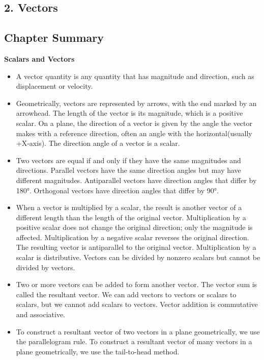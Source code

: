 \documentclass[12pt,addpoints]{exam}
\begin{document}
\begin{questions}
\begin{center}
			\section*{2. Vectors}
			\subsection*{Chapter Summary}
			\textbf{Scalars and Vectors} 
		\end{center}
		\begin{itemize}
			\item A vector quantity is any quantity that has magnitude and direction, such as displacement or velocity.
			\item Geometrically, vectors are represented by arrows, with the end marked by an arrowhead. The length of the vector is its magnitude, which is a positive scalar. On a plane, the direction of a vector is given by the angle the vector makes with a reference direction, often an angle with the horizontal(usually +X-axis). The direction angle of a vector is a scalar.
			\item Two vectors are equal if and only if they have the same magnitudes and directions. Parallel vectors have the same direction angles but may have different magnitudes. Antiparallel vectors have direction angles that differ by 180°. Orthogonal vectors have direction angles that differ by 90°.
			\item When a vector is multiplied by a scalar, the result is another vector of a different length than the length of the original vector. Multiplication by a positive scalar does not change the original direction; only the magnitude is affected. Multiplication by a negative scalar reverses the original direction. The resulting vector is antiparallel to the original vector. Multiplication by a scalar is distributive. Vectors can be divided by nonzero scalars but cannot be divided by vectors.
			\item Two or more vectors can be added to form another vector. The vector sum is called the resultant vector. We can add vectors to vectors or scalars to scalars, but we cannot add scalars to vectors. Vector addition is commutative and associative.
			\item To construct a resultant vector of two vectors in a plane geometrically, we use the parallelogram rule. To construct a resultant vector of many vectors in a plane geometrically, we use the tail-to-head method.
		\end{itemize}
		\begin{center}

\end{center}
\end{questions}
\end{document}
